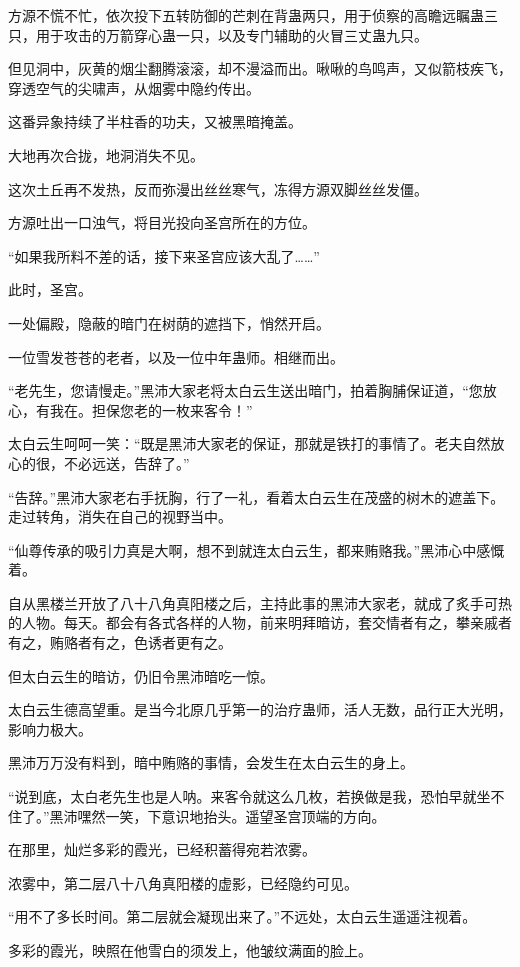 \begin{this_body}
方源不慌不忙，依次投下五转防御的芒刺在背蛊两只，用于侦察的高瞻远瞩蛊三只，用于攻击的万箭穿心蛊一只，以及专门辅助的火冒三丈蛊九只。

但见洞中，灰黄的烟尘翻腾滚滚，却不漫溢而出。啾啾的鸟鸣声，又似箭枝疾飞，穿透空气的尖啸声，从烟雾中隐约传出。

这番异象持续了半柱香的功夫，又被黑暗掩盖。

大地再次合拢，地洞消失不见。

这次土丘再不发热，反而弥漫出丝丝寒气，冻得方源双脚丝丝发僵。

方源吐出一口浊气，将目光投向圣宫所在的方位。

“如果我所料不差的话，接下来圣宫应该大乱了……”

此时，圣宫。

一处偏殿，隐蔽的暗门在树荫的遮挡下，悄然开启。

一位雪发苍苍的老者，以及一位中年蛊师。相继而出。

“老先生，您请慢走。”黑沛大家老将太白云生送出暗门，拍着胸脯保证道，“您放心，有我在。担保您老的一枚来客令！”

太白云生呵呵一笑：“既是黑沛大家老的保证，那就是铁打的事情了。老夫自然放心的很，不必远送，告辞了。”

“告辞。”黑沛大家老右手抚胸，行了一礼，看着太白云生在茂盛的树木的遮盖下。走过转角，消失在自己的视野当中。

“仙尊传承的吸引力真是大啊，想不到就连太白云生，都来贿赂我。”黑沛心中感慨着。

自从黑楼兰开放了八十八角真阳楼之后，主持此事的黑沛大家老，就成了炙手可热的人物。每天。都会有各式各样的人物，前来明拜暗访，套交情者有之，攀亲戚者有之，贿赂者有之，色诱者更有之。

但太白云生的暗访，仍旧令黑沛暗吃一惊。

太白云生德高望重。是当今北原几乎第一的治疗蛊师，活人无数，品行正大光明，影响力极大。

黑沛万万没有料到，暗中贿赂的事情，会发生在太白云生的身上。

“说到底，太白老先生也是人呐。来客令就这么几枚，若换做是我，恐怕早就坐不住了。”黑沛嘿然一笑，下意识地抬头。遥望圣宫顶端的方向。

在那里，灿烂多彩的霞光，已经积蓄得宛若浓雾。

浓雾中，第二层八十八角真阳楼的虚影，已经隐约可见。

“用不了多长时间。第二层就会凝现出来了。”不远处，太白云生遥遥注视着。

多彩的霞光，映照在他雪白的须发上，他皱纹满面的脸上。


\end{this_body}
